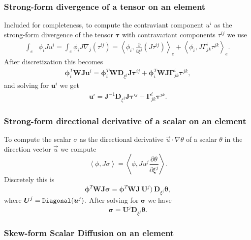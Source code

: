 \documentclass{report}
\newcommand{\inner}[2]{ \left\langle #1, #2 \right\rangle }
\newcommand{\mat}[1]{\boldsymbol #1}
\newcommand{\dvec}[1]{\boldsymbol #1}
\begin{document}
\subsubsection*{Strong-form divergence of a tensor on an element}
Included for completeness, to compute the contraviant component $u^{i}$ as
the strong-form divergence of the tensor $\mat{\tau}$  with contravariant
components $\tau^{ij}$ we use
\begin{align}
  \int_{e} &\phi_{i}J u^{i}
  =
  \int_{e} \phi_{i}J \nabla_{j}\left(\tau^{ij}\right)
  =
  \inner{
  \phi_{i}
  }{
  \frac{\partial}{\partial \xi^{j}}\left(
  J \tau^{ij}
  \right)
  }_{e}
  +
  \inner{\phi_{i}}{J \Gamma_{jk}^{i} \tau^{jk}}_{e}.
\end{align}
After discretization this becomes
\begin{align}
  \dvec{\phi}_{i}^{T} \mat{W} \mat{J} \dvec{u}^{i}
  =
  \dvec{\phi}_{i}^{T} \mat{W} \mat{D}_{\xi^j} \mat{J} \dvec{\tau}^{ij}
  +
  \dvec{\phi}_{i}^{T} \mat{W} \mat{J} \mat{\Gamma}^{i}_{jk} \dvec{\tau}^{jk},
\end{align}
and solving for $\dvec{u}^{i}$ we get
\begin{align}
  \dvec{u}^{i}
  =
  \mat{J}^{-1} \mat{D}_{\xi^j} \mat{J} \dvec{\tau}^{ij}
  +
  \mat{\Gamma}^{i}_{jk} \dvec{\tau}^{jk}.
\end{align}

\subsubsection*{Strong-form directional derivative of a scalar on an element}
To compute the scalar $\sigma$ as the directional derivative
$\vec{u} \cdot \nabla \theta$ of a scalar $\theta$ in the direction
vector $\vec{u}$ we compute
\begin{equation}
  \inner{\phi}{J \sigma} =
  \inner{\phi}{J u^j \frac{\partial\theta}{\partial \xi^j}}.
\end{equation}
Discretely this is
\begin{equation}
  \dvec{\phi}^{T} \mat{W} \mat{J} \dvec{\sigma}
  =
  \dvec{\phi}^{T} \mat{W} \mat{J}
  ~
  \mat{U}^j)
  ~
  \mat{D}_{\xi^{j}} \dvec{\theta},
\end{equation}
where $\mat{U}^j = \text{\tt Diagonal}(\vec{u}^{j})$.
After solving for $\dvec{\sigma}$ we have
\begin{equation}
  \dvec{\sigma}
  =
  \mat{U}^j \mat{D}_{\xi^{j}} \dvec{\theta}.
\end{equation}

\subsubsection*{Skew-form Scalar Diffusion on an element}
\end{document}
